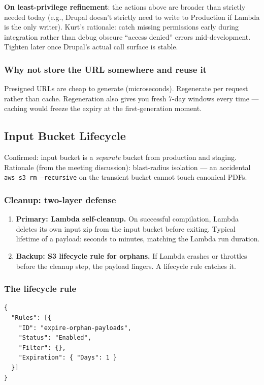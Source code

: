 \documentclass[11pt,letterpaper]{article}
\begin{document}
\textbf{On least-privilege refinement}: the actions above are broader than strictly needed today (e.g., Drupal doesn't strictly need to write to Production if Lambda is the only writer). Kurt's rationale: catch missing permissions early during integration rather than debug obscure ``access denied'' errors mid-development. Tighten later once Drupal's actual call surface is stable.

\subsubsection{Why not store the URL somewhere and reuse it}
Presigned URLs are cheap to generate (microseconds). Regenerate per request rather than cache. Regeneration also gives you fresh 7-day windows every time --- caching would freeze the expiry at the first-generation moment.

\subsection{Input Bucket Lifecycle}
\label{sec:meeting-input-lifecycle}

Confirmed: input bucket is a \emph{separate} bucket from production and staging. Rationale (from the meeting discussion): blast-radius isolation --- an accidental \texttt{aws s3 rm --recursive} on the transient bucket cannot touch canonical PDFs.

\subsubsection{Cleanup: two-layer defense}
\begin{enumerate}[nosep]
  \item \textbf{Primary: Lambda self-cleanup.} On successful compilation, Lambda deletes its own input zip from the input bucket before exiting. Typical lifetime of a payload: seconds to minutes, matching the Lambda run duration.
  \item \textbf{Backup: S3 lifecycle rule for orphans.} If Lambda crashes or throttles before the cleanup step, the payload lingers. A lifecycle rule catches it.
\end{enumerate}

\subsubsection{The lifecycle rule}
\begin{lstlisting}[style=worxcode]
{
  "Rules": [{
    "ID": "expire-orphan-payloads",
    "Status": "Enabled",
    "Filter": {},
    "Expiration": { "Days": 1 }
  }]
}
\end{lstlisting}
\end{document}
